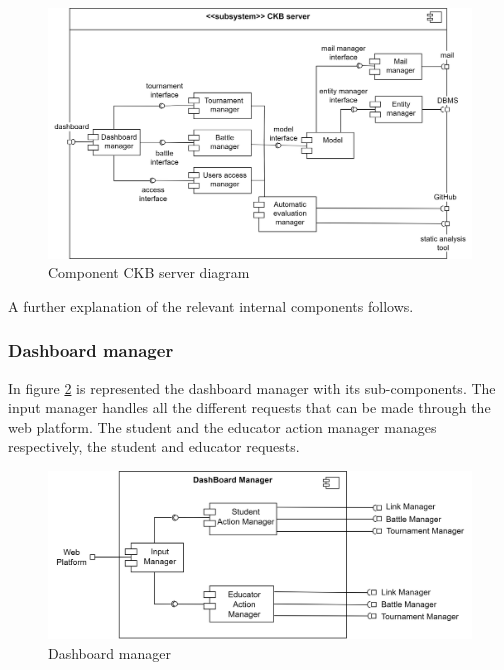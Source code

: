 \begin{figure}[h]
    \centering
    \includegraphics[width=\textwidth]{images/component-CKBserver.png}
    \caption{Component CKB server diagram}
    \label{fig:comp-CKBserver}
\end{figure}

A further explanation of the relevant internal components follows.
\clearpage

\subsubsection*{Dashboard manager}
In figure \ref{fig:dash-man} is represented the dashboard manager with its sub-components. The input manager handles all the different requests that can be made through the web platform. The student and the educator action manager manages respectively, the student and educator requests.
\begin{figure}[h]
    \centering
    \includegraphics[scale = 0.5]{images/dash-man.png}
    \caption{Dashboard manager}
    \label{fig:dash-man}
\end{figure}


